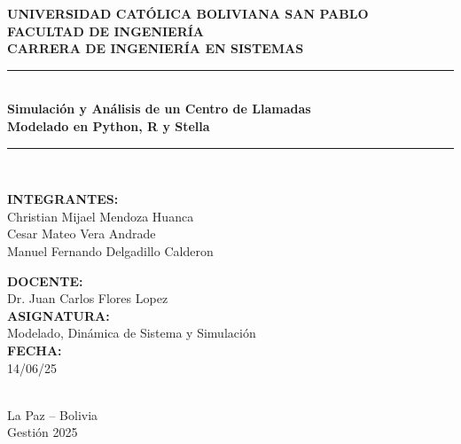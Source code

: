 \documentclass[12pt]{article}
\begin{document}
\begin{titlepage}
    \centering
    {\Large \textbf{UNIVERSIDAD CATÓLICA BOLIVIANA SAN PABLO}\\[0.3cm]}
    {\large \textbf{FACULTAD DE INGENIERÍA}\\[0.3cm]}
    {\large \textbf{CARRERA DE INGENIERÍA EN SISTEMAS}\\[1.5cm]}
    \rule{\textwidth}{1pt}\\[0.5cm]
    {\Huge \textbf{Simulación y Análisis de un Centro de Llamadas}\\[0.3cm]}
    {\Large \textbf{Modelado en Python, R y Stella}\\[0.5cm]}
    \rule{\textwidth}{1pt}\\[0.5cm]
    \begin{minipage}{0.45\textwidth}
        \raggedright
        \large
        \textbf{INTEGRANTES:}\\
        Christian Mijael Mendoza Huanca  \\
        Cesar Mateo Vera Andrade  \\
        Manuel Fernando Delgadillo Calderon  \\
    \end{minipage}
    \hfill
    \begin{minipage}{0.45\textwidth}
        \raggedleft
        \large
        \textbf{DOCENTE:}\\
       Dr. Juan Carlos Flores Lopez\\[0.2cm]
        \textbf{ASIGNATURA:}\\
        Modelado, Dinámica de Sistema y Simulación\\[0.2cm]
        \textbf{FECHA:}\\
        14/06/25
    \end{minipage}\\[2cm]
    {\large La Paz -- Bolivia}\\[0.1cm]
    {\large Gestión 2025}
\end{titlepage}

\tableofcontents
\newpage

\end{document}
